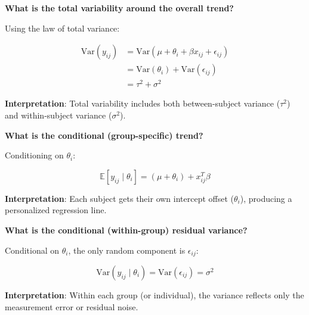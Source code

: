 \documentclass[
  letterpaper,
  DIV=11,
  numbers=noendperiod]{scrreprt}
\begin{document}
\begin{tcolorbox}[enhanced jigsaw, rightrule=.15mm, breakable, left=2mm, colframe=quarto-callout-tip-color-frame, opacityback=0, leftrule=.75mm, toprule=.15mm, colback=white, arc=.35mm, bottomrule=.15mm]

\textbf{What is the total variability around the overall
trend?}\vspace{2mm}

Using the law of total variance:

\[
\begin{align*}
\text{Var}(y_{ij}) & = \text{Var}(\mu + \theta_i + \beta x_{ij} + \epsilon_{ij})\\
&  = \text{Var}(\theta_i) + \text{Var}(\epsilon_{ij}) \\
& = \tau^2 + \sigma^2
\end{align*}
\]

\textbf{Interpretation}: Total variability includes both between-subject
variance (\(\tau^2\)) and within-subject variance (\(\sigma^2\)).

\end{tcolorbox}

\begin{tcolorbox}[enhanced jigsaw, rightrule=.15mm, breakable, left=2mm, colframe=quarto-callout-tip-color-frame, opacityback=0, leftrule=.75mm, toprule=.15mm, colback=white, arc=.35mm, bottomrule=.15mm]

\textbf{What is the conditional (group-specific) trend?}\vspace{2mm}

Conditioning on \(\theta_i\):

\[ 
\mathbb{E}[y_{ij} \mid \theta_i] = (\mu + \theta_i) +  x_{ij}^T \beta
\]

\textbf{Interpretation}: Each subject gets their own intercept offset
(\(\theta_i\)), producing a personalized regression line.

\end{tcolorbox}

\begin{tcolorbox}[enhanced jigsaw, rightrule=.15mm, breakable, left=2mm, colframe=quarto-callout-tip-color-frame, opacityback=0, leftrule=.75mm, toprule=.15mm, colback=white, arc=.35mm, bottomrule=.15mm]

\textbf{What is the conditional (within-group) residual
variance?}\vspace{2mm}

Conditional on \(\theta_i\), the only random component is
\(\epsilon_{ij}\):

\[
\text{Var}(y_{ij} \mid \theta_i) = \text{Var}(\epsilon_{ij}) = \sigma^2 
\]

\textbf{Interpretation}: Within each group (or individual), the variance
reflects only the measurement error or residual noise.

\end{tcolorbox}
\end{document}
